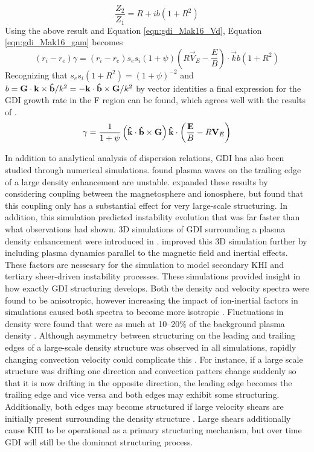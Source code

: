 \begin{equation}
	\frac{Z_2}{Z_1} = R+ib(1+R^2)
\end{equation}
Using the above result and Equation \ref{eqn:gdi_Mak16_Vd}, Equation \ref{eqn:gdi_Mak16_gam} becomes
\begin{equation}
	(r_i-r_e)\gamma = (r_i-r_e)s_es_i\left(1+\psi\right)\left(R\vec{V}_E-\frac{E}{B}\right)\cdot\vec{k}b\left(1+R^2\right)
\end{equation}
Recognizing that \(s_es_i\left(1+R^2\right) = (1+\psi)^{-2}\) and \(b = \mathbf{G}\cdot\mathbf{k}\times\mathbf{\hat{b}}/k^2 = -\mathbf{k}\cdot\mathbf{\hat{b}}\times\mathbf{G}/k^2\) by vector identities a final expression for the GDI growth rate in the F region can be found, which agrees well with the results of \citet{Makarevitch2014c}.
\begin{equation}
	\label{eqn:gdi}
	\gamma = \frac{1}{1+\psi}\left(\mathbf{\hat{k}}\cdot\mathbf{\hat{b}}\times\mathbf{G}\right)\mathbf{\hat{k}}\cdot\left(\frac{\mathbf{E}}{B}-R\mathbf{V}_E\right)
\end{equation}

In addition to analytical analysis of dispersion relations, GDI has also been studied through numerical simulations.  \citet{Keskinen1982} found plasma waves on the trailing edge of a large density enhancement are unstable.  \citet{Keskinen1990} expanded these results by considering coupling between the magnetosphere and ionosphere, but found that this coupling only has a substantial effect for very large-scale structuring.  In addition, this simulation predicted instability evolution that was far faster than what observations had shown.  3D simulations of GDI surrounding a plasma density enhancement were introduced in \citet{Guzdar1998}.  \citet{Gondarenko1999} improved this 3D simulation further by including plasma dynamics parallel to the magnetic field and inertial effects.  These factors are nessesary for the simulation to model secondary KHI and tertiary sheer-driven instability processes.  These simulations provided insight in how exactly GDI structuring develops.  Both the density and velocity spectra were found to be anisotropic, however increasing the impact of ion-inertial factors in simulations caused both spectra to become more isotropic \citep{Gondarenko2001}.  Fluctuations in density were found that were as much at 10--20\% of the background plasma density \citep{Gondarenko2004a}.  Although asymmetry between structuring on the leading and trailing edges of a large-scale density structure was observed in all simulations, rapidly changing convection velocity could complicate this \citep{Gondarenko2004b}.  For instance, if a large scale structure was drifting one direction and convection patters change suddenly so that it is now drifting in the opposite direction, the leading edge becomes the trailing edge and vice versa and both edges may exhibit some structuring.  Additionally, both edges may become structured if large velocity shears are initially present surrounding the density structure \citep{Gondarenko2006}.  Large shears additionally cause KHI to be operational as a primary structuring mechanism, but over time GDI will still be the dominant structuring process.

